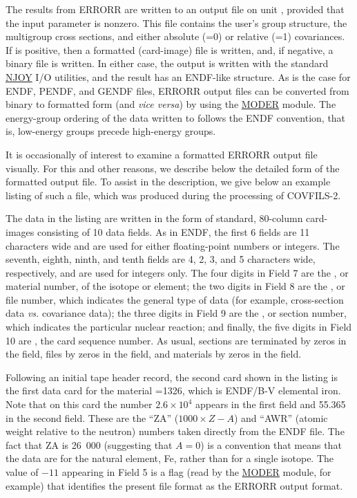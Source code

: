 The results from ERRORR are written to an output file on unit
, provided that the input parameter  is
nonzero.  This file contains the user's group structure, the
multigroup cross sections, and either absolute (=0) or
relative (=1) covariances.  If  is positive,
then a formatted (card-image) file is written, and, if negative, a
binary file is written.  In either case, the output is written with the
standard \hyperlink{sNJOYhy}{NJOY} I/O utilities, and the result
has an ENDF-like structure.  As is the case for ENDF, PENDF, and
GENDF files, ERRORR output files can be converted from binary to
formatted form (and {\it vice versa}) by using the
\hyperlink{sMODERhy}{MODER} module.  The energy-group ordering of
the data written to  follows the ENDF convention, that is,
low-energy groups precede high-energy groups.

It is occasionally of interest to examine a formatted ERRORR output
file visually.  For this and other reasons, we describe below the
detailed form of the formatted output file.  To assist in the
description, we give below an example listing of such a file, which
was produced during the processing of COVFILS-2\cite{COVFILS2}.

The data in the listing are written in the form of standard, 80-column
card-images consisting of 10 data fields.  As in ENDF, the first 6
fields are 11 characters wide and are used for either floating-point
numbers or integers.  The seventh, eighth, ninth, and tenth fields are
4, 2, 3, and 5 characters wide, respectively, and are used for integers
only. The four digits in Field 7 are the , or material
number, of the isotope or element; the two digits in Field 8 are the
, or file number, which indicates the general type of data
(for example, cross-section data {\it vs.} covariance data); the three
digits in Field 9 are the , or section number, which
indicates the particular nuclear reaction; and finally, the five digits
in Field 10 are , the card sequence number.
As usual, sections are terminated by zeros in the  field,
files by zeros in the  field, and materials by zeros in
the  field.

Following an initial tape header record, the second card shown in
the listing is the first data card for the material =1326, which
is ENDF/B-V elemental iron.  Note that on this card the number $2.6\times 10^4$
appears in the first field and 55.365 in the second field.  These are
the ``ZA'' ($1000 \times Z - A$) and ``AWR'' (atomic weight relative to
the neutron) numbers taken directly from the ENDF file.  The fact that
ZA is 26~000 (suggesting that $A = 0$) is a convention that means that
the data are for the natural element, Fe, rather than for a single
isotope.  The value of $-11$ appearing in Field 5 is a flag (read by
the \hyperlink{sMODERhy}{MODER} module, for example) that identifies
the present file format as the ERRORR output format.


